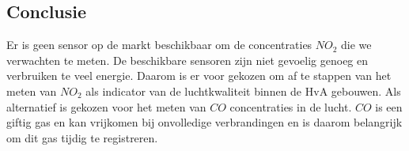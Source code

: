 \documentclass[a4paper, 11pt]{article} %
\begin{document}
\subsection{Conclusie}
Er is geen sensor op de markt beschikbaar om de concentraties $NO_2$ die we verwachten te meten. De beschikbare sensoren zijn niet gevoelig genoeg en verbruiken te veel energie. Daarom is er voor gekozen om af te stappen van het meten van $NO_2$ als indicator van de luchtkwaliteit binnen de HvA gebouwen. Als alternatief is gekozen voor het meten van $CO$ concentraties in de lucht. $CO$ is een giftig gas en kan vrijkomen bij onvolledige verbrandingen en is daarom belangrijk om dit gas tijdig te registreren. 
\end{document}
